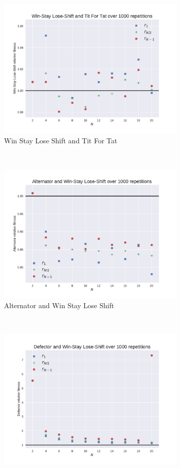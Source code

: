 \documentclass{article}
\begin{document}
\begin{figure}[!hbtp]
    \begin{subfigure}[t]{.3\textwidth}
        \centering
        \includegraphics[width=.8\textwidth]{./img/Win-Stay_Lose-Shift_v_Tit_For_Tat_fitness.pdf}
        \caption{Win Stay Lose Shift and Tit For Tat}
    \end{subfigure}%
    ~
    \begin{subfigure}[t]{.3\textwidth}
        \centering
        \includegraphics[width=.8\textwidth]{./img/Alternator_v_Win-Stay_Lose-Shift_fitness.pdf}
        \caption{Alternator and Win Stay Lose Shift}
    \end{subfigure}%
    ~
    \begin{subfigure}[t]{.3\textwidth}
        \centering
        \includegraphics[width=.8\textwidth]{./img/Defector_v_Win-Stay_Lose-Shift_fitness.pdf}

\end{subfigure}
\end{figure}
\end{document}
